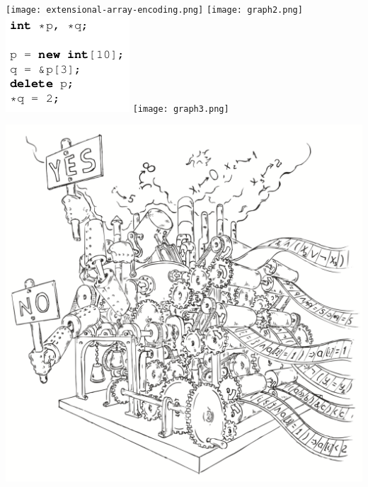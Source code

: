 \documentclass{beamer}
\begin{document}
\begin{frame}{}
\texttt{[image: extensional-array-encoding.png]}
\texttt{[image: graph2.png]}
\includegraphics[scale=0.5]{ex2.png}
\texttt{[image: graph3.png]}
\end{frame}

\begin{frame}
\includegraphics[scale=0.5]{../decision-procedure.png}
\end{frame}
\end{document}

